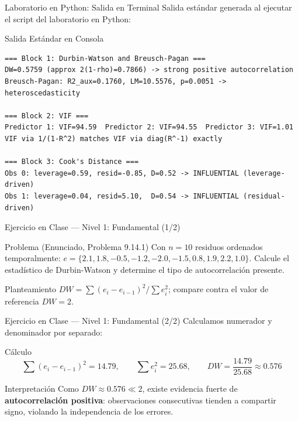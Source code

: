 \documentclass[10pt, aspectratio=169]{beamer}
\begin{document}
\begin{frame}[fragile]{Laboratorio en Python: Salida en Terminal}
  \scriptsize
  Salida estándar generada al ejecutar el script del laboratorio en Python:
  \vspace{0.02cm}
  \begin{block}{Salida Estándar en Consola}
    \fontsize{3.6pt}{4.3pt}\selectfont
    \begin{verbatim}
=== Block 1: Durbin-Watson and Breusch-Pagan ===
DW=0.5759 (approx 2(1-rho)=0.7866) -> strong positive autocorrelation
Breusch-Pagan: R2_aux=0.1760, LM=10.5576, p=0.0051 -> heteroscedasticity

=== Block 2: VIF ===
Predictor 1: VIF=94.59  Predictor 2: VIF=94.55  Predictor 3: VIF=1.01
VIF via 1/(1-R^2) matches VIF via diag(R^-1) exactly

=== Block 3: Cook's Distance ===
Obs 0: leverage=0.59, resid=-0.85, D=0.52 -> INFLUENTIAL (leverage-driven)
Obs 1: leverage=0.04, resid=5.10,  D=0.54 -> INFLUENTIAL (residual-driven)
    \end{verbatim}
  \end{block}
\end{frame}

\begin{frame}{Ejercicio en Clase --- Nivel 1: Fundamental (1/2)}
  \footnotesize
  \begin{block}{Problema (Enunciado, Problema 9.14.1)}
    Con $n=10$ residuos ordenados temporalmente: $e=\{2.1,1.8,-0.5,-1.2,-2.0,-1.5,0.8,1.9,2.2,1.0\}$. Calcule el estadístico de Durbin-Watson y determine el tipo de autocorrelación presente.
  \end{block}

  \vspace{0.15cm}
  \pause
  \begin{alertblock}{Planteamiento}
    $DW=\sum(e_i-e_{i-1})^2/\sum e_i^2$; compare contra el valor de referencia $DW=2$.
  \end{alertblock}
\end{frame}

\begin{frame}{Ejercicio en Clase --- Nivel 1: Fundamental (2/2)}
  \scriptsize
  Calculamos numerador y denominador por separado: \pause

  \vspace{0.05cm}
  \begin{block}{Cálculo}
    $$\sum(e_i-e_{i-1})^2=14.79, \qquad \sum e_i^2=25.68, \qquad DW=\frac{14.79}{25.68}\approx0.576$$
  \end{block}

  \vspace{0.05cm}
  \pause
  \begin{alertblock}{Interpretación}
    Como $DW\approx0.576\ll2$, existe evidencia fuerte de \textbf{autocorrelación positiva}: observaciones consecutivas tienden a compartir signo, violando la independencia de los errores.
  \end{alertblock}
\end{frame}
\end{document}
